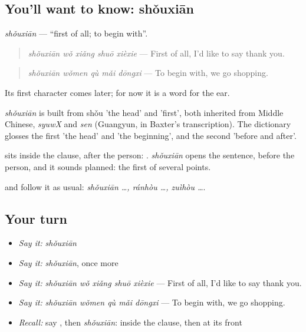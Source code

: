 \subsection*{You'll want to know: shǒuxiān}
\emph{shǒuxiān} — \textquotedblleft{}first of all; to begin with\textquotedblright{}.

\begin{quote}
\emph{shǒuxiān wǒ xiǎng shuō xièxie} — First of all, I'd like to say thank you.
\end{quote}

\begin{quote}
\emph{shǒuxiān wǒmen qù mǎi dōngxi} — To begin with, we go shopping.
\end{quote}

Its first character comes later; for now it is a word for the ear.

\begin{cousinweb}
\emph{shǒuxiān} is built from shǒu 'the head' and  'first', both inherited from Middle Chinese, \emph{syuwX} and \emph{sen} (Guangyun, in Baxter's transcription). The dictionary glosses the first 'the head' and 'the beginning', and the second 'before and after'.
\end{cousinweb}

\begin{grammarlens}[title={What you've built}]
 sits inside the clause, after the person: . \emph{shǒuxiān} opens the sentence, before the person, and it sounds planned: the first of several points.

 and  follow it as usual: \emph{shǒuxiān …, ránhòu …, zuìhòu …}.
\end{grammarlens}

\subsection*{Your turn}
\begin{itemize}
\raggedright
  \item \emph{Say it:} \emph{shǒuxiān}
  \item \emph{Say it:} \emph{shǒuxiān}, once more
  \item \emph{Say it:} \emph{shǒuxiān wǒ xiǎng shuō xièxie} — First of all, I'd like to say thank you.
  \item \emph{Say it:} \emph{shǒuxiān wǒmen qù mǎi dōngxi} — To begin with, we go shopping.
  \item \emph{Recall:} say , then \emph{shǒuxiān}: inside the clause, then at its front
\end{itemize}


